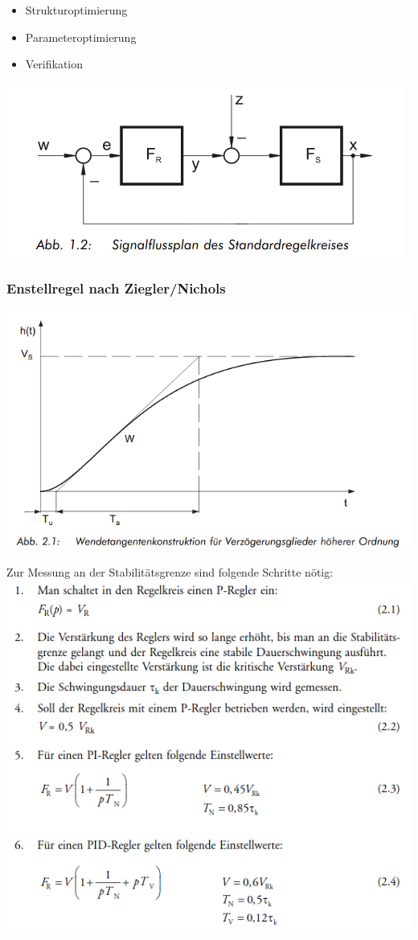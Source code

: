 \begin{itemize}
  \item Strukturoptimierung
  \item Parameteroptimierung
  \item Verifikation
\end{itemize}
\includegraphics[scale= 0.5]{themen/pict/standardregelkreis.png}

\subsubsection{Enstellregel nach Ziegler/Nichols}
\includegraphics[scale= 0.5]{themen/pict/wendetangente.png}

Zur Messung an der Stabilitätsgrenze sind folgende Schritte nötig:\\
\includegraphics[scale= 0.5]{themen/pict/variante1-ziegler.png}

